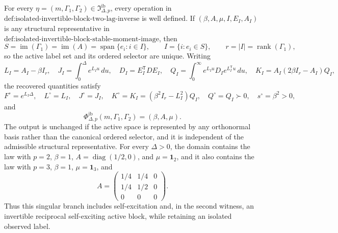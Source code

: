 For every \(\eta=(m,\Gamma_1,\Gamma_2)\in\mathfrak I_{\Delta,p}^{\mathrm{ib}}\), every operation in \(\text{def:isolated-invertible-block-two-lag-inverse}\) is well defined.  If \((\beta,A,\mu,I,E_I,A_I)\) is any structural representative in \(\text{def:isolated-invertible-block-stable-moment-image}\), then
\[
 S=\operatorname{im}(\Gamma_1)=\operatorname{im}(A)
   =\operatorname{span}\{e_i:i\in I\},\qquad
 I=\{i:e_i\in S\},\qquad r=|I|=\operatorname{rank}(\Gamma_1),
\]
so the active label set and its ordered selector are unique.  Writing
\[
 L_I=A_I-\beta I_r,\quad
 J_I=\int_0^\Delta e^{L_Iu}\,du,\quad
 D_I=E_I^{\mathsf T}DE_I,\quad
 Q_I=\int_0^\infty e^{L_Iu}D_Ie^{L_I^{\mathsf T}u}\,du,\quad
 K_I=A_I(2\beta I_r-A_I)Q_I,
\]
the recovered quantities satisfy
\[
 F^\circ=e^{L_I\Delta},\quad L^\circ=L_I,\quad J^\circ=J_I,\quad
 K^\circ=K_I=(\beta^2I_r-L_I^2)Q_I,\quad Q^\circ=Q_I\succ0,\quad s^\circ=\beta^2>0,
\]
and
\[
 \Phi_{\Delta,p}^{\mathrm{ib}}(m,\Gamma_1,\Gamma_2)=(\beta,A,\mu).
\]
The output is unchanged if the active space is represented by any orthonormal basis rather than the canonical ordered selector, and it is independent of the admissible structural representative.  For every \(\Delta>0\), the domain contains the law with \(p=2\), \(\beta=1\), \(A=\operatorname{diag}(1/2,0)\), and \(\mu=\mathbf 1_2\), and it also contains the law with \(p=3\), \(\beta=1\), \(\mu=\mathbf 1_3\), and
\[
 A=\begin{pmatrix}1/4&1/4&0\\1/4&1/2&0\\0&0&0\end{pmatrix}.
\]
Thus this singular branch includes self-excitation and, in the second witness, an invertible reciprocal self-exciting active block, while retaining an isolated observed label.